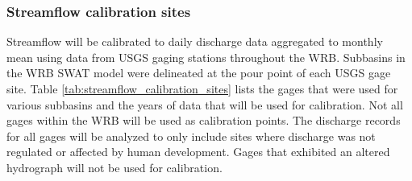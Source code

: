 \subsubsection{Streamflow calibration sites}\label{sec:streamflow_calibration_sites}

Streamflow will be calibrated to daily discharge data aggregated to monthly mean using data from USGS gaging stations throughout the WRB. Subbasins in the WRB SWAT model were delineated at the pour point of each USGS gage site. Table \ref{tab:streamflow_calibration_sites} lists the gages that were used for various subbasins and the years of data that will be used for calibration. Not all gages within the WRB will be used as calibration points. The discharge records for all gages will be analyzed to only include sites where discharge was not regulated or affected by human development. Gages that exhibited an altered hydrograph will not be used for calibration.

